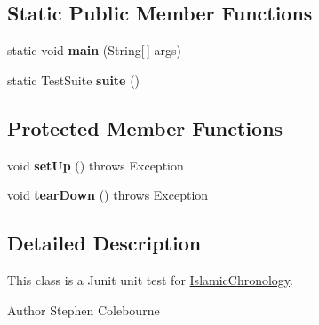 \subsection*{Static Public Member Functions}
\begin{DoxyCompactItemize}
\item 
\hypertarget{classorg_1_1joda_1_1time_1_1chrono_1_1_test_islamic_chronology_ac725f25edd3333dd2df5748d028e70b0}{static void {\bfseries main} (String\mbox{[}$\,$\mbox{]} args)}\label{classorg_1_1joda_1_1time_1_1chrono_1_1_test_islamic_chronology_ac725f25edd3333dd2df5748d028e70b0}

\item 
\hypertarget{classorg_1_1joda_1_1time_1_1chrono_1_1_test_islamic_chronology_af7ca5f4dd7404c98669628b486270d96}{static Test\-Suite {\bfseries suite} ()}\label{classorg_1_1joda_1_1time_1_1chrono_1_1_test_islamic_chronology_af7ca5f4dd7404c98669628b486270d96}

\end{DoxyCompactItemize}
\subsection*{Protected Member Functions}
\begin{DoxyCompactItemize}
\item 
\hypertarget{classorg_1_1joda_1_1time_1_1chrono_1_1_test_islamic_chronology_ae1af880e292169808a30f7a3ab6cf6d2}{void {\bfseries set\-Up} ()  throws Exception }\label{classorg_1_1joda_1_1time_1_1chrono_1_1_test_islamic_chronology_ae1af880e292169808a30f7a3ab6cf6d2}

\item 
\hypertarget{classorg_1_1joda_1_1time_1_1chrono_1_1_test_islamic_chronology_a4000c376c89428fac529bbd3625db734}{void {\bfseries tear\-Down} ()  throws Exception }\label{classorg_1_1joda_1_1time_1_1chrono_1_1_test_islamic_chronology_a4000c376c89428fac529bbd3625db734}

\end{DoxyCompactItemize}


\subsection{Detailed Description}
This class is a Junit unit test for \hyperlink{classorg_1_1joda_1_1time_1_1chrono_1_1_islamic_chronology}{Islamic\-Chronology}.

\begin{DoxyAuthor}{Author}
Stephen Colebourne 
\end{DoxyAuthor}


